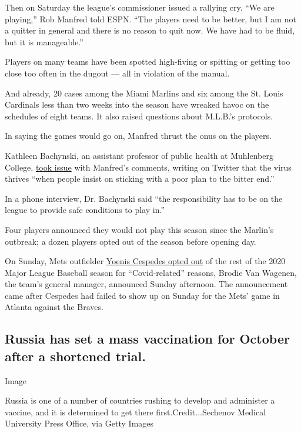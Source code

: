 Then on Saturday the league's commissioner issued a rallying cry. ``We
are playing,'' Rob Manfred told ESPN. ``The players need to be better,
but I am not a quitter in general and there is no reason to quit now. We
have had to be fluid, but it is manageable.''

Players on many teams have been spotted high-fiving or spitting or
getting too close too often in the dugout --- all in violation of the
manual.

And already, 20 cases among the Miami Marlins and six among the St.
Louis Cardinals less than two weeks into the season have wreaked havoc
on the schedules of eight teams. It also raised questions about M.L.B.'s
protocols.

In saying the games would go on, Manfred thrust the onus on the players.

Kathleen Bachynski, an assistant professor of public health at
Muhlenberg College,
\href{https://twitter.com/bachyns/status/1289665507117772800}{took
issue} with Manfred's comments, writing on Twitter that the virus
thrives ``when people insist on sticking with a poor plan to the bitter
end.''

In a phone interview, Dr. Bachynski said ``the responsibility has to be
on the league to provide safe conditions to play in.''

Four players announced they would not play this season since the
Marlin's outbreak; a dozen players opted out of the season before
opening day.

On Sunday, Mets outfielder
\href{https://www.nytimes.com/2020/08/02/sports/baseball/Yoenis-cespedes-opt-out-rule.html}{Yoenis
Cespedes opted out} of the rest of the 2020 Major League Baseball season
for ``Covid-related'' reasons, Brodie Van Wagenen, the team's general
manager, announced Sunday afternoon. The announcement came after
Cespedes had failed to show up on Sunday for the Mets' game in Atlanta
against the Braves.

\hypertarget{russia-has-set-a-mass-vaccination-for-october-after-a-shortened-trial}{%
\subsection{Russia has set a mass vaccination for October after a
shortened
trial.}\label{russia-has-set-a-mass-vaccination-for-october-after-a-shortened-trial}}

Image

Russia is one of a number of countries rushing to develop and administer
a vaccine, and it is determined to get there first.Credit...Sechenov
Medical University Press Office, via Getty Images

